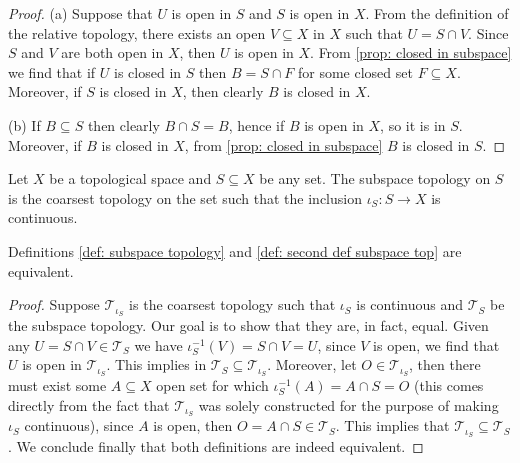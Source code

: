 \begin{proof}
(a) Suppose that \(U\) is open in \(S\) and \(S\) is open in \(X\). From the
definition of the relative topology, there exists an open \(V \subseteq X\) in
\(X\) such that \(U = S \cap V\). Since \(S\) and \(V\) are both open in
\(X\), then \(U\) is open in \(X\). From \cref{prop: closed in subspace} we
find that if \(U\) is closed in \(S\) then \(B = S \cap F\) for some closed
set \(F \subseteq X\). Moreover, if \(S\) is closed in \(X\), then clearly
\(B\) is closed in \(X\).

(b) If \(B \subseteq S\) then clearly \(B \cap S = B\), hence if \(B\) is open
in \(X\), so it is in \(S\). Moreover, if \(B\) is closed in \(X\), from
\cref{prop: closed in subspace} \(B\) is closed in \(S\).
\end{proof}

\begin{definition}
\label{def: second def subspace top}
Let \(X\) be a topological space and \(S \subseteq X\) be any set. The
subspace topology on \(S\) is the coarsest topology on the set such that the
inclusion \(\iota_S: S \to X\) is continuous.
\end{definition}

\begin{corollary}
Definitions \ref{def: subspace topology} and \ref{def: second def subspace
top} are equivalent.
\end{corollary}

\begin{proof}
Suppose \(\mathcal T_{\iota_S}\) is the coarsest topology such that
\(\iota_S\) is continuous and \(\mathcal T_S\) be the subspace topology. Our
goal is to show that they are, in fact, equal. Given any \(U = S \cap V \in
\mathcal T_S\) we have \(\iota_S^{-1}(V) = S \cap V = U\), since \(V\) is
open, we find that \(U\) is open in \(\mathcal T_{\iota_S}\). This implies in
\(\mathcal T_S \subseteq \mathcal T_{\iota_S}\). Moreover, let \(O \in
\mathcal T_{\iota_S}\), then there must exist some \(A \subseteq X\) open set
for which \(\iota_S^{-1}(A) = A \cap S = O\) (this comes directly from the
fact that \(\mathcal T_{\iota_S}\) was solely constructed for the purpose of
making \(\iota_S\) continuous), since \(A\) is open, then \(O = A \cap S \in
\mathcal T_S\). This implies that \(\mathcal T_{\iota_S} \subseteq \mathcal
T_S\). We conclude finally that both definitions are indeed equivalent.
\end{proof}

